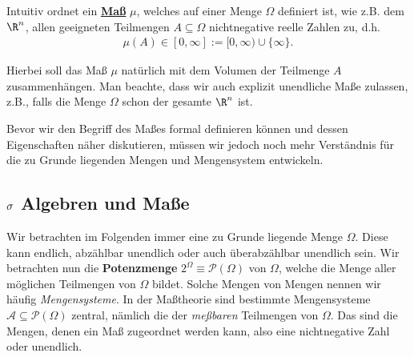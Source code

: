 \documentclass[letterpaper,10pt,english]{jupyterBook}
\begin{document}
\par
Intuitiv ordnet ein \href{https://de.wikipedia.org/wiki/Ma\%c3\%9f\_(Mathematik)}{\textbf{Maß}} \(\mu\), welches auf einer Menge \(\Omega\) definiert ist, wie z.B. dem \(\R^n\), allen geeigneten Teilmengen \(A\subseteq \Omega\) nichtnegative reelle Zahlen zu, d.h.
\begin{align*}
\mu(A)\in[0,\infty] := [0,\infty)\cup\{\infty\}.
\end{align*}
\par
Hierbei soll das Maß \(\mu\) natürlich mit dem Volumen der Teilmenge \(A\) zusammenhängen.
Man beachte, dass wir auch explizit unendliche Maße zulassen, z.B., falls die Menge \(\Omega\) schon der gesamte \(\R^n\) ist.

\par
Bevor wir den Begriff des Maßes formal definieren können und dessen Eigenschaften näher diskutieren, müssen wir jedoch noch mehr Verständnis für die zu Grunde liegenden Mengen und Mengensystem entwickeln.


\subsection{\protect\(\sigma\protect\) Algebren und Maße}
\label{\detokenize{masstheorie/masstheorie:sigma-algebren-und-masze}}
\par
Wir betrachten im Folgenden immer eine zu Grunde liegende Menge \(\Omega\).
Diese kann endlich, abzählbar unendlich oder auch überabzählbar unendlich sein.
Wir betrachten nun die \textbf{Potenzmenge} \(2^\Omega \equiv\mathcal{P}(\Omega)\) von \(\Omega\), welche die Menge aller möglichen Teilmengen von \(\Omega\) bildet.
Solche Mengen von Mengen nennen wir häufig \emph{Mengensysteme}.
In der Maßtheorie sind bestimmte Mengensysteme \(\mathcal{A} \subseteq \mathcal{P}(\Omega)\) zentral, nämlich die der \emph{meßbaren} Teilmengen von \(\Omega\).
Das sind die Mengen, denen ein Maß zugeordnet werden kann, also eine nichtnegative Zahl oder unendlich.
\end{document}
